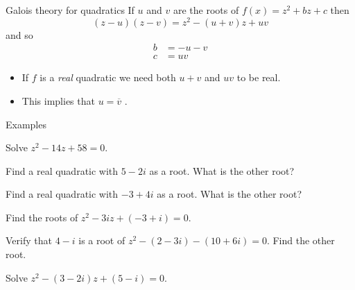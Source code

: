 \documentclass{beamer}
\begin{document}
\begin{frame}{Galois theory for quadratics}
If $u$ and $v$ are the roots of $f(x) = z^2 + bz+c$ then
\begin{equation*}
(z-u)(z-v) = z^2 - (u+v)z + uv
\end{equation*}
and so
\begin{align*}
b & = -u-v\\
c & = uv
\end{align*}
\begin{itemize}
	\item If $f$ is a \emph{real} quadratic we need both $u+v$ and $uv$ to be real.
	\item This implies that $u = \overline{v}$ .
\end{itemize}
\end{frame}

\begin{frame}{Examples}
\begin{example}
Solve $z^2-14z+58 = 0$.
\end{example}
\begin{example}
Find a real quadratic with $5-2i$ as a root. What is the other root?
\end{example}
\begin{example}
Find a real quadratic with $-3+4i$ as a root. What is the other root?
\end{example}
\end{frame}

\begin{frame}
\begin{example}
Find the roots of $z^2-3iz+(-3+i) = 0$.
\end{example}
\begin{example}
Verify that $4-i$ is a root of $z^2 - (2-3i)-(10+6i) = 0$. Find the other root.
\end{example}
\begin{example}
Solve $z^2-(3-2i)z + (5-i) = 0$.
\end{example}
\end{frame}
\end{document}
